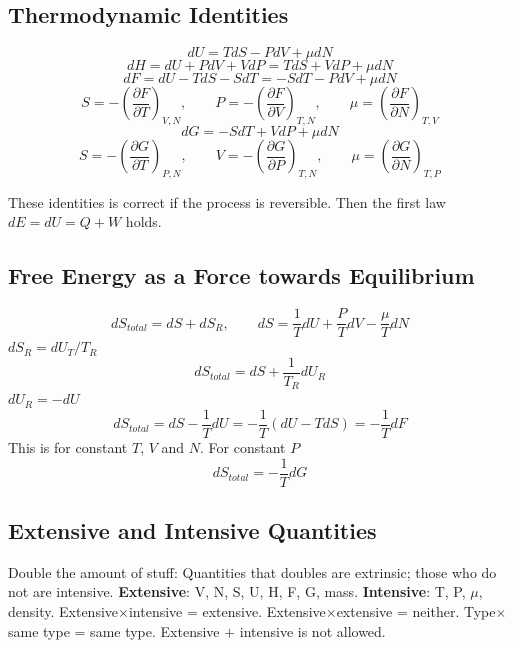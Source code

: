 \documentclass[a4paper,norsk, 10pt]{article}
\newcommand{\pd}[3]{\left(\frac{\partial #1}{\partial #2}\right)_{#3}}
\begin{document}
\subsection{Thermodynamic Identities}
\begin{equation}
dU = TdS - PdV + \mu dN
\end{equation}
\begin{equation}
dH = dU + PdV + VdP = TdS + VdP + \mu dN
\end{equation}
\begin{equation}
dF = dU - TdS - SdT = - SdT - PdV + \mu dN
\end{equation}
\begin{equation}
S = -\pd{F}{T}{V,N}, \qquad P = -\pd{F}{V}{T,N},\qquad \mu = \pd{F}{N}{T,V}
\end{equation}
\begin{equation}
dG = - SdT + VdP + \mu dN
\end{equation}
\begin{equation}
S = -\pd{G}{T}{P,N}, \qquad V = -\pd{G}{P}{T,N},\qquad \mu = \pd{G}{N}{T,P}
\end{equation}

These identities is correct if the process is reversible. Then the first law $dE = dU = Q + W$ holds.
\subsection{ Free Energy as a Force towards Equilibrium}
\begin{equation}
dS_{total} = dS + dS_R, \qquad dS = \frac{1}{T}dU  + \frac{P}{T}dV - \frac{\mu}{T}dN
\end{equation}
$dS_R = dU_T/T_R$
\begin{equation}
dS_{total} = dS + \frac{1}{T_R}dU_R
\end{equation}
$dU_R = - dU$
\begin{equation}
dS_{total} = dS - \frac{1}{T}dU = -\frac{1}{T}(dU - TdS) =-\frac{1}{T}dF
\end{equation}
This is for constant $T$, $V$ and $N$. For constant $P$
\begin{equation}
dS_{total}=-\frac{1}{T}dG
\end{equation}
\subsection{Extensive and Intensive Quantities}
Double the amount of stuff: Quantities that doubles are extrinsic; those who do not are intensive. \textbf{Extensive}: V, N, S, U, H, F, G, mass. \textbf{Intensive}: T, P, $\mu$, density. Extensive$\times$intensive = extensive. Extensive$\times$extensive = neither. Type$\times$same type = same type. Extensive $+$ intensive is not allowed.
\end{document}
